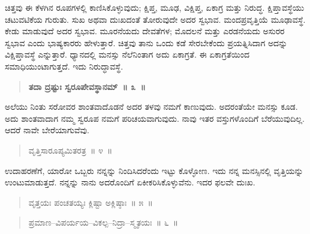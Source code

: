 ಚಿತ್ತವು ಈ ಕೆಳಗಿನ ರೂಪಗಳಲ್ಲಿ ಕಾಣಿಸಿಕೊಳ್ಳುವುದು; ಕ್ಷಿಪ್ತ, ಮೂಢ, ವಿಕ್ಷಿಪ್ತ, ಏಕಾಗ್ರ ಮತ್ತು ನಿರುದ್ಧ. ಕ್ಷಿಪ್ತಾವಸ್ಥೆಯು ಚಟುವಟಿಕೆಯ ಗುರುತು. ಸುಖ ಅಥವಾ ದುಃಖದಂತೆ ತೋರುವುದೇ ಅದರ ಸ್ವಭಾವ. ಮಂದಪ್ರವೃತ್ತಿಯೆ ಮೂಢಾವಸ್ಥೆ. ಕೇಡು ಮಾಡುವುದೆ ಅದರ ಸ್ವಭಾವ. ಮೂರನೆಯದು ದೇವತೆಗಳ; ಮೊದಲನೆ ಮತ್ತು ಎರಡನೆಯದು ಅಸುರರ ಸ್ವಭಾವ ಎಂದು ಭಾಷ್ಯಕಾರರು ಹೇಳುತ್ತಾರೆ. ಚಿತ್ತವು ತಾನು ಒಂದು ಕಡೆ ಸೇರಬೇಕೆಂದು ಪ್ರಯತ್ನಿಸಿದಾಗ ಅದನ್ನು ವಿಕ್ಷಿಪ್ತಾವಸ್ಥೆ ಎನ್ನುತ್ತಾರೆ. ಧ್ಯಾನದಲ್ಲಿ ಮನಸ್ಸು ನೆಲೆನಿಂತಾಗ ಅದು ಏಕಾಗ್ರತೆ. ಈ ಏಕಾಗ್ರತೆಯಿಂದ ಸಮಾಧಿಯುಂಟಾಗುತ್ತದೆ. ಇದು ನಿರುದ್ಧಾವಸ್ಥೆ. 

\vspace{-0.2cm}

\begin{verse}
\textbf{ತದಾ ದ್ರಷ್ಟುಃ ಸ್ವರೂಪೇವಸ್ಥಾನಮ್​~॥ ೩~॥}
\end{verse}

\vspace{-0.1cm}


ಅಲೆಯು ನಿಂತು ಸರೋವರ ಶಾಂತವಾದೊಡನೆ ಅದರ ತಳವು ನಮಗೆ ಕಾಣುವುದು. ಅದರಂತೆಯೇ ಮನಸ್ಸು ಕೂಡ. ಅದು ಶಾಂತವಾದಾಗ ನಮ್ಮ ಸ್ವರೂಪ ನಮಗೆ ಪರಿಚಯವಾಗುವುದು. ನಾವು ಇತರ ವಸ್ತುಗಳೊಂದಿಗೆ ಬೆರೆಯುವುದಿಲ್ಲ. ಆದರೆ ನಾವೇ ಬೇರೆಯಾಗುವೆವು. 

\vspace{-0.2cm}

\begin{verse}
ವೃತ್ತಿಸಾರೂಪ್ಯಮಿತರತ್ರ~॥ ೪~॥
\end{verse}

\vspace{-0.1cm}


ಉದಾಹರಣೆಗೆ, ಯಾರೋ ಒಬ್ಬರು ನನ್ನನ್ನು ನಿಂದಿಸಿದರೆಂದು ಇಟ್ಟು ಕೊಳ್ಳೋಣ. ಇದು ನನ್ನ ಮನಸ್ಸಿನಲ್ಲಿ ವೃತ್ತಿಯನ್ನು ಉಂಟುಮಾಡುತ್ತದೆ. ನನ್ನನ್ನು ನಾನು ಅದರೊಂದಿಗೆ ಏಕೀಕರಿಸಿಕೊಳ್ಳುವೆನು. ಇದರ ಫಲವೇ ದುಃಖ. 

\vspace{-0.2cm}

\begin{verse}
ವೃತ್ತಯಃ ಪಂಚತಯ್ಯಃ ಕ್ಲಿಷ್ಟಾ ಅಕ್ಲಿಷ್ಠಾಃ~॥ ೫~॥
\end{verse}

\vspace{-0.1cm}


\vspace{-0.2cm}

\begin{verse}
ಪ್ರಮಾಣ–ವಿಪರ್ಯಯ–ವಿಕಲ್ಪ–ನಿದ್ರಾ–ಸ್ಮೃತಯಃ~॥ ೬~॥
\end{verse}


